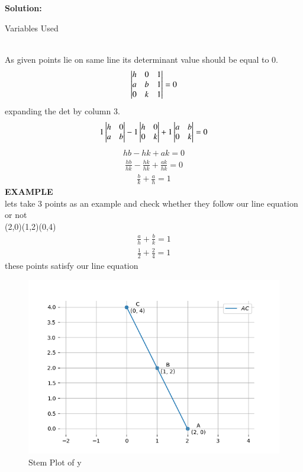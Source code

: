 \documentclass[journal]{IEEEtran}
\begin{document}
\textbf{Solution: }
\begin{table}[h!]    
  \centering
  
  \caption{Variables Used}
  \label{tab10.5.3.9.1}
\end{table}\\
As given points lie on same line its determinant value should be equal to 0.
\begin{align}
 \begin{vmatrix}h & 0 & 1 \\ a & b & 1 \\ 0 & k & 1\end{vmatrix} = 0 \label{1.6.9.1}
\end{align}
expanding the det by column 3.
\begin{align}
 1\begin{vmatrix}h & 0 \\ a & b\end{vmatrix} - 1\begin{vmatrix} h & 0 \\ 0 & k \end{vmatrix} + 1\begin{vmatrix} a & b \\ 0 & k \end{vmatrix} = 0
\end{align}
\begin{align}
 hb - hk + ak = 0
\end{align}
\begin{align}
 \frac{hb}{hk} - \frac{hk}{hk} + \frac{ak}{hk} = 0
\end{align}
\begin{align}
 \frac{b}{k} + \frac{a}{h} = 1
\end{align}
\textbf{EXAMPLE}\\
lets take 3 points as an example and check whether they follow our line equation or not \\
(2,0)(1,2)(0,4)
\begin{align}
 \frac{a}{h} + \frac{b}{k} = 1
\end{align}
\begin{align}
 \frac{1}{2} + \frac{2}{4}  =  1
\end{align}
these points satisfy our line equation
\begin{figure}[h!]
   \centering
   \includegraphics[width=0.7\linewidth]{figs/fig2.png}
   \caption{Stem Plot of y}
   \label{stemplot}
\end{figure}
\end{document}
